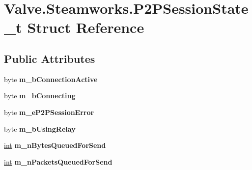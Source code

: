 \hypertarget{structValve_1_1Steamworks_1_1P2PSessionState__t}{}\section{Valve.\+Steamworks.\+P2\+P\+Session\+State\+\_\+t Struct Reference}
\label{structValve_1_1Steamworks_1_1P2PSessionState__t}
\subsection*{Public Attributes}
\begin{DoxyCompactItemize}
\item 
\hypertarget{structValve_1_1Steamworks_1_1P2PSessionState__t_a9d6e5ad8c180a7b202c8e4a2b4baa8d3}{}byte {\bfseries m\+\_\+b\+Connection\+Active}\label{structValve_1_1Steamworks_1_1P2PSessionState__t_a9d6e5ad8c180a7b202c8e4a2b4baa8d3}

\item 
\hypertarget{structValve_1_1Steamworks_1_1P2PSessionState__t_a50df4e00ce757c7b6e94b06989de379e}{}byte {\bfseries m\+\_\+b\+Connecting}\label{structValve_1_1Steamworks_1_1P2PSessionState__t_a50df4e00ce757c7b6e94b06989de379e}

\item 
\hypertarget{structValve_1_1Steamworks_1_1P2PSessionState__t_a514aa661445b97f0c8e4a86f98627358}{}byte {\bfseries m\+\_\+e\+P2\+P\+Session\+Error}\label{structValve_1_1Steamworks_1_1P2PSessionState__t_a514aa661445b97f0c8e4a86f98627358}

\item 
\hypertarget{structValve_1_1Steamworks_1_1P2PSessionState__t_a28f464f7554d10500d3efe16d823912a}{}byte {\bfseries m\+\_\+b\+Using\+Relay}\label{structValve_1_1Steamworks_1_1P2PSessionState__t_a28f464f7554d10500d3efe16d823912a}

\item 
\hypertarget{structValve_1_1Steamworks_1_1P2PSessionState__t_a055d28af4e56e2cd68cd74b81a941c8e}{}\hyperlink{SDL__thread_8h_a6a64f9be4433e4de6e2f2f548cf3c08e}{int} {\bfseries m\+\_\+n\+Bytes\+Queued\+For\+Send}\label{structValve_1_1Steamworks_1_1P2PSessionState__t_a055d28af4e56e2cd68cd74b81a941c8e}

\item 
\hypertarget{structValve_1_1Steamworks_1_1P2PSessionState__t_ac56e1f6d4a10f75a9c58a045f8f4d34c}{}\hyperlink{SDL__thread_8h_a6a64f9be4433e4de6e2f2f548cf3c08e}{int} {\bfseries m\+\_\+n\+Packets\+Queued\+For\+Send}\label{structValve_1_1Steamworks_1_1P2PSessionState__t_ac56e1f6d4a10f75a9c58a045f8f4d34c}


\end{DoxyCompactItemize}
